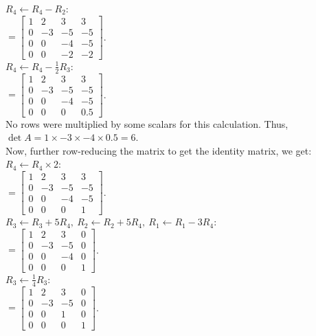 \documentclass[a4paper]{article}
\begin{document}
\begin{enumerate}
$R_4 \leftarrow R_4 - R_2$:\\
$= \begin{bmatrix}1 & 2 & 3 & 3\\0 & -3 & -5 & -5\\0 & 0 & -4 & -5\\0 & 0 & -2 & -2\end{bmatrix}$.\\

$R_4 \leftarrow R_4 - \frac{1}{2}R_3$:\\
$= \begin{bmatrix}1 & 2 & 3 & 3\\0 & -3 & -5 & -5\\0 & 0 & -4 & -5\\0 & 0 & 0 & 0.5\end{bmatrix}$.\\

No rows were multiplied by some scalars for this calculation. Thus, $\det A = 1 \times -3 \times -4 \times 0.5 = 6$.\\

Now, further row-reducing the matrix to get the identity matrix, we get:\\
$R_4 \leftarrow R_4 \times 2$:\\
$= \begin{bmatrix}1 & 2 & 3 & 3\\0 & -3 & -5 & -5\\0 & 0 & -4 & -5\\0 & 0 & 0 & 1\end{bmatrix}$.\\

$R_3 \leftarrow R_3 + 5R_4,\ R_2 \leftarrow R_2 + 5R_4,\ R_1 \leftarrow R_1 - 3R_4$:\\
$= \begin{bmatrix}1 & 2 & 3 & 0\\0 & -3 & -5 & 0\\0 & 0 & -4 & 0\\0 & 0 & 0 & 1\end{bmatrix}$.\\

$R_3 \leftarrow \frac{1}{4}R_3$:\\
$= \begin{bmatrix}1 & 2 & 3 & 0\\0 & -3 & -5 & 0\\0 & 0 & 1 & 0\\0 & 0 & 0 & 1\end{bmatrix}$.\\


\end{enumerate}
\end{document}

